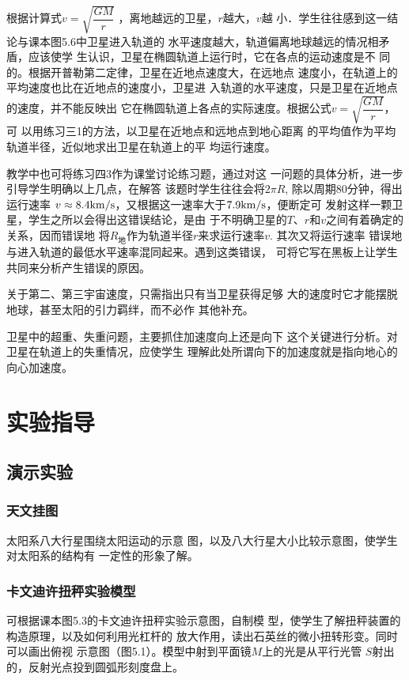 根据计算式$v=\sqrt{\dfrac{GM}{r}}$
，离地越远的卫星，$r$越大，$v$越
小．学生往往感到这一结论与课本图5.6中卫星进入轨道的
水平速度越大，轨道偏离地球越远的情况相矛盾，应该使学
生认识，卫星在椭圆轨道上运行时，它在各点的运动速度是不
同的。根据开普勒第二定律，卫星在近地点速度大，在远地点
速度小，在轨道上的平均速度也比在近地点的速度小，卫星进
入轨道的水平速度，只是卫星在近地点的速度，并不能反映出
它在椭圆轨道上各点的实际速度。根据公式$v=\sqrt{\dfrac{GM}{r}}$，
可
以用练习三1的方法，以卫星在近地点和远地点到地心距离
的平均值作为平均轨道半径，近似地求出卫星在轨道上的平
均运行速度。

教学中也可将练习四3作为课堂讨论练习题，通过对这
一问题的具体分析，进一步引导学生明确以上几点，在解答
该题时学生往往会将$2\pi R$, 除以周期80分钟，得出运行速率
$v\approx 8.4{\rm km/s}$，又根据这一速率大于$7.9{\rm km/s}$，便断定可
发射这样一颗卫星，学生之所以会得出这错误结论，是由
于不明确卫星的$T$、$r$和$v$之间有着确定的关系，因而错误地
将$R_{\text{地}}$作为轨道半径$r$来求运行速率$v$. 其次又将运行速率
错误地与进入轨道的最低水平速率混同起来。遇到这类错误，
可将它写在黑板上让学生共同来分析产生错误的原因。

关于第二、第三宇宙速度，只需指出只有当卫星获得足够
大的速度时它才能摆脱地球，甚至太阳的引力羁绊，而不必作
其他补充。

卫星中的超重、失重问题，主要抓住加速度向上还是向下
这个关键进行分析。对卫星在轨道上的失重情况，应使学生
理解此处所谓向下的加速度就是指向地心的向心加速度。

\section{实验指导}
\subsection{演示实验}

\subsubsection{天文挂图}

太阳系八大行星围绕太阳运动的示意
图，以及八大行星大小比较示意图，使学生对太阳系的结构有
一定性的形象了解。

\subsubsection{卡文迪许扭秤实验模型}
可根据课本图5.3的卡文迪许扭秤实验示意图，自制模
型，使学生了解扭秤装置的构造原理，以及如何利用光杠杆的
放大作用，读出石英丝的微小扭转形变。同时可以画出俯视
示意图（图5.1）。模型中射到平面镜$M$上的光是从平行光管
$S$射出的，反射光点投到圆弧形刻度盘上。

